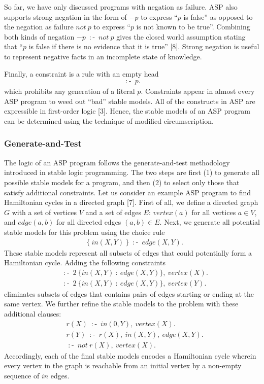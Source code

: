 So far, we have only discussed programs with negation as failure. ASP also supports 
strong negation in the form of $-p$ to express ``$p$ is false'' as opposed to 
the negation as failure $not \: p$ to express ``$p$ is not known to be true''. Combining 
both kinds of negation $-p \: \mathop{:\!\!-} \: not \: p$ gives the closed world assumption 
stating that ``$p$ is false if there is no evidence that it is true'' [8]. Strong negation 
is useful to represent negative facts in an incomplete state of knowledge.

Finally, a constraint is a rule with an empty head 
\begin{align*}
    \mathop{:\!\!-} \: p.
\end{align*}
which prohibits 
any generation of a literal $p$. Constraints appear in almost every ASP program to weed out 
``bad'' stable models. All of the constructs in ASP are expressible in first-order 
logic [3]. Hence, the stable models of an ASP program can be determined using the 
technique of modified circumscription.

\subsubsection{Generate-and-Test}
The logic of an ASP program follows the generate-and-test methodology introduced in 
stable logic programming. The two steps are first (1) to generate all possible stable models 
for a program, and then (2) to select only those that satisfy additional constraints. Let us 
consider an example ASP program to find Hamiltonian cycles in a directed graph [7]. First of all, 
we define a directed graph $G$ with a set of vertices $V$ and a set of edges $E$: 
$vertex(a)$ for all vertices $a \in V$, and $edge(a,b)$ for all directed edges $(a,b) \in E$. Next, 
we generate all potential stable models for this problem using the choice rule 
\begin{align*}
    & \{ \: in(X,Y) \: \} \: \mathop{:\!\!-} \: edge(X,Y). 
\end{align*}
These stable models represent all subsets of edges that could potentially form a Hamiltonian 
cycle. Adding the following constraints 
\begin{align*}
    & \mathop{:\!\!-} \: 2 \: \{in(X,Y) \: : \: edge(X,Y)\}, \: vertex(X). \\
    & \mathop{:\!\!-} \: 2 \: \{in(X,Y) \: : \: edge(X,Y)\}, \: vertex(Y). 
\end{align*}
eliminates subsets of edges that contains pairs of edges starting or ending at the same 
vertex. We further refine the stable models to the problem with these additional clauses: 
\begin{align*}
    & r(X) \: \mathop{:\!\!-} \: in(0,Y), \: vertex(X).\\
    & r(Y) \: \mathop{:\!\!-} \: r(X), \: in(X,Y), \: edge(X,Y). \\ 
    & \mathop{:\!\!-} \: not \: r(X), \: vertex(X).
\end{align*}
Accordingly, each of the final stable models encodes a Hamiltonian cycle wherein every vertex in the graph 
is reachable from an initial 
vertex by a non-empty sequence of $in$ edges.

